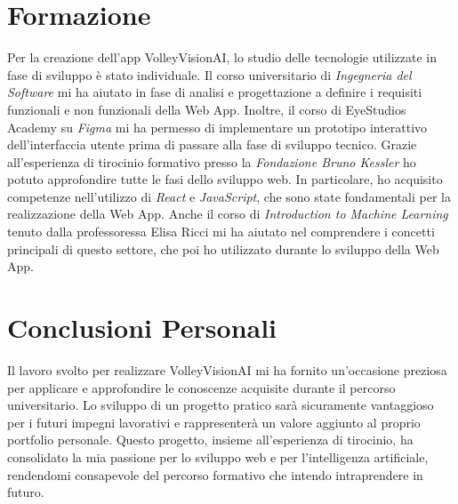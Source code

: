 \section{Formazione}

Per la creazione dell'app VolleyVisionAI, lo studio delle tecnologie utilizzate in fase di sviluppo è stato individuale. Il corso universitario di \textit{Ingegneria del Software} mi ha aiutato in fase di analisi e progettazione a definire i requisiti funzionali e non funzionali della Web App. Inoltre, il corso di EyeStudios Academy su \textit{Figma} mi ha permesso di implementare un prototipo interattivo dell'interfaccia utente prima di passare alla fase di sviluppo tecnico. 
Grazie all'esperienza di tirocinio formativo presso la \textit{Fondazione Bruno Kessler} ho potuto approfondire tutte le fasi dello sviluppo web. In particolare, ho acquisito competenze nell'utilizzo di \textit{React} e \textit{JavaScript}, che sono state fondamentali per la realizzazione della Web App. 
Anche il corso di \textit{Introduction to Machine Learning} tenuto dalla professoressa Elisa Ricci mi ha aiutato nel comprendere i concetti principali di questo settore, che poi ho utilizzato durante lo sviluppo della Web App. 

\section{Conclusioni Personali}

Il lavoro svolto per realizzare VolleyVisionAI mi ha fornito un'occasione preziosa per applicare e approfondire le conoscenze acquisite durante il percorso universitario. 
Lo sviluppo di un progetto pratico sarà sicuramente vantaggioso per i futuri impegni lavorativi e rappresenterà un valore aggiunto al proprio portfolio personale.
Questo progetto, insieme all'esperienza di tirocinio, ha consolidato la mia passione per lo sviluppo web e per l'intelligenza artificiale, rendendomi consapevole del percorso formativo che intendo intraprendere in futuro.




